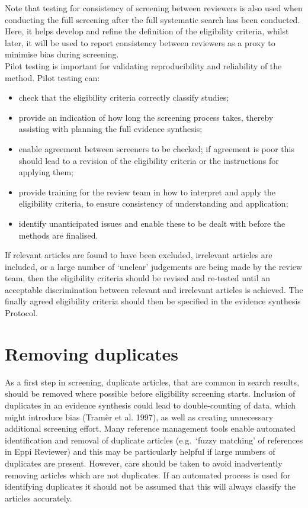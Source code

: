\documentclass[
  letterpaper,
  DIV=11,
  numbers=noendperiod]{scrreprt}
\providecommand{\tightlist}{%
  \setlength{\itemsep}{0pt}\setlength{\parskip}{0pt}}
\begin{document}
Note that testing for consistency of screening between reviewers is also
used when conducting the full screening after the full systematic search
has been conducted. Here, it helps develop and refine the definition of
the eligibility criteria, whilst later, it will be used to report
consistency between reviewers as a proxy to minimise bias during
screening.\\
Pilot testing is important for validating reproducibility and
reliability of the method. Pilot testing can:

\begin{itemize}
\tightlist
\item
  check that the eligibility criteria correctly classify studies;
\item
  provide an indication of how long the screening process takes, thereby
  assisting with planning the full evidence synthesis;
\item
  enable agreement between screeners to be checked; if agreement is poor
  this should lead to a revision of the eligibility criteria or the
  instructions for applying them;
\item
  provide training for the review team in how to interpret and apply the
  eligibility criteria, to ensure consistency of understanding and
  application;
\item
  identify unanticipated issues and enable these to be dealt with before
  the methods are finalised.
\end{itemize}

If relevant articles are found to have been excluded, irrelevant
articles are included, or a large number of `unclear' judgements are
being made by the review team, then the eligibility criteria should be
revised and re-tested until an acceptable discrimination between
relevant and irrelevant articles is achieved. The finally agreed
eligibility criteria should then be specified in the evidence synthesis
Protocol.

\section{Removing duplicates}\label{removing-duplicates}

As a first step in screening, duplicate articles, that are common in
search results, should be removed where possible before eligibility
screening starts. Inclusion of duplicates in an evidence synthesis could
lead to double-counting of data, which might introduce bias (Tramèr et
al. 1997), as well as creating unnecessary additional screening effort.
Many reference management tools enable automated identification and
removal of duplicate articles (e.g.~`fuzzy matching' of references in
Eppi Reviewer) and this may be particularly helpful if large numbers of
duplicates are present. However, care should be taken to avoid
inadvertently removing articles which are not duplicates. If an
automated process is used for identifying duplicates it should not be
assumed that this will always classify the articles accurately.
\end{document}
